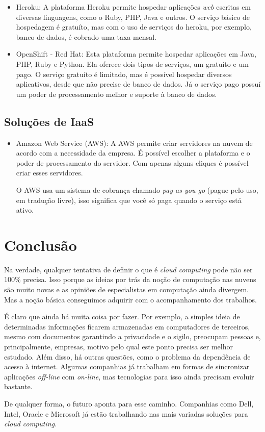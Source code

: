 \documentclass{abnt}
\begin{document}
		\begin{itemize}
			\item Heroku: A plataforma Heroku permite hospedar aplicações \textit{web} escritas em diversas linguagens, como o Ruby, PHP, Java e outros. O serviço básico de hospedagem é gratuíto, mas com o uso de serviços do heroku, por exemplo, banco de dados, é cobrado uma taxa mensal.
			\item OpenShift - Red Hat: Esta plataforma permite hospedar aplicações em Java, PHP, Ruby e Python. Ela oferece dois tipos de serviços, um gratuíto e um pago. O serviço gratuíto é limitado, mas é possível hospedar diversos aplicativos, desde que não precise de banco de dados. Já o serviço pago possuí um poder de processamento melhor e suporte à banco de dados.
		\end{itemize}

	\section{Soluções de IaaS}

		\begin{itemize}
			\item Amazon Web Service (AWS): A AWS permite criar servidores na nuvem de acordo com a necessidade da empresa. É possível escolher a plataforma e o poder de processamento do servidor. Com apenas alguns cliques é possível criar esses servidores. 
			
			O AWS usa um sistema de cobrança chamado \textit{pay-as-you-go} (pague pelo uso, em tradução livre), isso significa que você só paga quando o serviço está ativo.
		\end{itemize}
	
	\chapter{Conclusão}
	
	Na verdade, qualquer tentativa de definir o que é \textit{cloud computing} pode não ser 100\% precisa. Isso porque as 
	ideias por trás da noção de computação nas nuvens são muito novas e as opiniões de especialistas em computação 
	ainda divergem. Mas a noção básica conseguimos adquirir com o acompanhamento dos trabalhos.
	
	É claro que ainda há muita coisa por fazer. Por exemplo, a simples ideia de determinadas informações ficarem 
	armazenadas em computadores de terceiros, mesmo com documentos garantindo a privacidade e o sigilo, 
	preocupam pessoas e, principalmente, empresas, motivo pelo qual este ponto precisa ser melhor estudado. 
	Além disso, há outras questões, como o problema da dependência de acesso à internet. Algumas companhias já 
	trabalham em formas de sincronizar aplicações \textit{off-line} com \textit{on-line}, mas tecnologias para isso ainda precisam 
	evoluir bastante.
	
	De qualquer forma, o futuro aponta para esse caminho. Companhias como Dell, Intel, Oracle e 
	Microsoft já estão trabalhando nas mais variadas soluções para \textit{cloud computing}.
	
	
	
\end{document}

